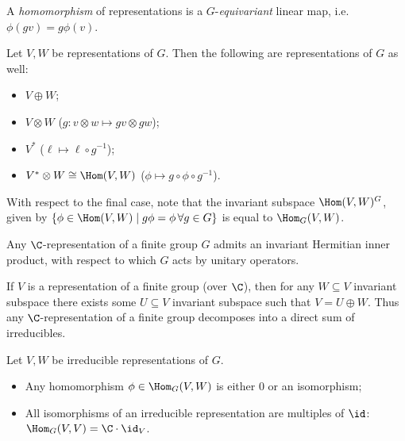 \documentclass{notes}
\begin{document}
\begin{defn}
    A \emph{homomorphism} of representations is a $G$-\emph{equivariant} linear map, i.e. $\phi (gv)=g\phi (v)$.
\end{defn}

\begin{theorem}
    Let $V,W$ be representations of $G$. Then the following are representations of $G$ as well:
    \begin{itemize}
        \item $V\oplus W$;
        \item $V\otimes W$ ($g\colon v\otimes w \mapsto  gv\otimes gw $);
        \item $V^{*}$ ($\ell \mapsto \ell \circ g^{-1}$);
        \item $V^{*}\otimes W\cong \Hom (V,W)$ ($\phi \mapsto g\circ\phi \circ g^{-1}$).
    \end{itemize}

    With respect to the final case, note that the invariant subspace $\Hom (V,W)^G$, given by $\left\{ \phi \in \Hom (V,W)\mid  g\phi =\phi \,\forall g\in G \right\} $ is equal to $\Hom _G(V,W)$.
\end{theorem}

\begin{theorem}
    Any $\C $-representation of a finite group $G$ admits an invariant Hermitian inner product, with respect to which $G$ acts by unitary operators.
\end{theorem}

\begin{theorem}
    If $V$ is a representation of a finite group (over $\C $), then for any $W\subseteq V$ invariant subspace there exists some $U\subseteq V$ invariant subspace such that $V=U\oplus W$. Thus any $\C $-representation of a finite group decomposes into a direct sum of irreducibles. 
\end{theorem}

\begin{lemma}[Schur]
    Let $V,W$ be irreducible representations of $G$.
    \begin{itemize}
        \item Any homomorphism $\phi \in \Hom _G(V,W)$ is either 0 or an isomorphism;
        \item All isomorphisms of an irreducible representation are multiples of $\id $: $\Hom _G(V,V)=\C \cdot \id _V$.
    \end{itemize}
\end{lemma}
\end{document}
